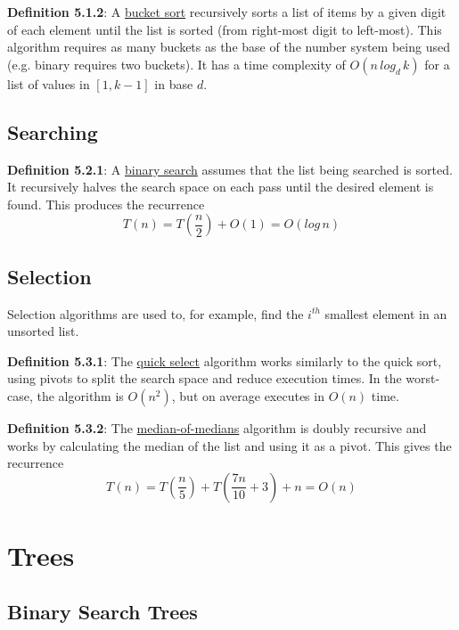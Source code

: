 \documentclass{article}
\newcommand{\separate}[1] {\vspace{#1 pt}\noindent}
\newcommand{\definition}[2]{\textbf{Definition #1}: #2\label{def:#1}}
\begin{document}
\separate{5}\definition{5.1.2}{A \underline{bucket sort} recursively sorts a list of items by a given digit of each element until the list is sorted (from right-most digit to left-most). This algorithm requires as many buckets as the base of the number system being used (e.g. binary requires two buckets).}
It has a time complexity of \(O(n \, log_d \, k)\) for a list of values in \([1,k-1]\) in base \(d\).

\subsection{Searching}

\definition{5.2.1}{A \underline{binary search} assumes that the list being searched is sorted. It recursively halves the search space on each pass until the desired element is found. This produces the recurrence}
\begin{equation}
    T(n) = T\left(\frac{n}{2}\right) + O(1) = O(log \, n)
\end{equation}

\subsection{Selection}

Selection algorithms are used to, for example, find the \(i^{th}\) smallest element in an unsorted list.

\separate{5}\definition{5.3.1}{The \underline{quick select} algorithm works similarly to the quick sort, using pivots to split the search space and reduce execution times.}
In the worst-case, the algorithm is \(O(n^2)\), but on average executes in \(O(n)\) time.

\separate{5}\definition{5.3.2}{The \underline{median-of-medians} algorithm is doubly recursive and works by calculating the median of the list and using it as a pivot.} This gives the recurrence
\begin{equation}
    T(n) = T\left(\frac{n}{5}\right) + T\left(\frac{7n}{10} + 3\right) + n = O(n)
\end{equation}

\section{Trees}

\subsection{Binary Search Trees}
\end{document}
